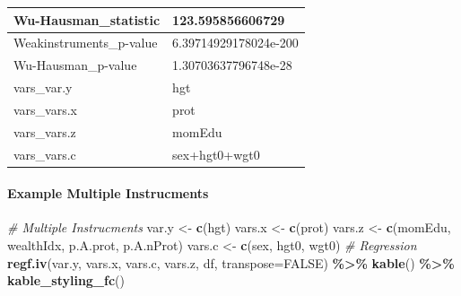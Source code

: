 \documentclass[
]{book}
\newenvironment{Shaded}{\begin{snugshade}}{\end{snugshade}}
\newcommand{\CommentTok}[1]{\textcolor[rgb]{0.56,0.35,0.01}{\textit{#1}}}
\newcommand{\DataTypeTok}[1]{\textcolor[rgb]{0.13,0.29,0.53}{#1}}
\newcommand{\KeywordTok}[1]{\textcolor[rgb]{0.13,0.29,0.53}{\textbf{#1}}}
\newcommand{\NormalTok}[1]{#1}
\newcommand{\OperatorTok}[1]{\textcolor[rgb]{0.81,0.36,0.00}{\textbf{#1}}}
\newcommand{\OtherTok}[1]{\textcolor[rgb]{0.56,0.35,0.01}{#1}}
\newcommand{\StringTok}[1]{\textcolor[rgb]{0.31,0.60,0.02}{#1}}
\begin{document}
\begin{table}[!h]
\begin{tabular}{l|l}
\hline
\rowcolor{gray!6}  Wu-Hausman\_statistic & 123.595856606729\\
\hline
Weakinstruments\_p-value & 6.39714929178024e-200\\
\hline
\rowcolor{gray!6}  Wu-Hausman\_p-value & 1.30703637796748e-28\\
\hline
vars\_var.y & hgt\\
\hline
\rowcolor{gray!6}  vars\_vars.x & prot\\
\hline
vars\_vars.z & momEdu\\
\hline
\rowcolor{gray!6}  vars\_vars.c & sex+hgt0+wgt0\\
\hline
\end{tabular}
\end{table}

\hypertarget{example-multiple-instrucments}{%
\paragraph{Example Multiple Instrucments}\label{example-multiple-instrucments}}

\begin{Shaded}
\begin{Highlighting}[]
\CommentTok{\# Multiple Instrucments}
\NormalTok{var.y \textless{}{-}}\StringTok{ }\KeywordTok{c}\NormalTok{(}\StringTok{\textquotesingle{}hgt\textquotesingle{}}\NormalTok{)}
\NormalTok{vars.x \textless{}{-}}\StringTok{ }\KeywordTok{c}\NormalTok{(}\StringTok{\textquotesingle{}prot\textquotesingle{}}\NormalTok{)}
\NormalTok{vars.z \textless{}{-}}\StringTok{ }\KeywordTok{c}\NormalTok{(}\StringTok{\textquotesingle{}momEdu\textquotesingle{}}\NormalTok{, }\StringTok{\textquotesingle{}wealthIdx\textquotesingle{}}\NormalTok{, }\StringTok{\textquotesingle{}p.A.prot\textquotesingle{}}\NormalTok{, }\StringTok{\textquotesingle{}p.A.nProt\textquotesingle{}}\NormalTok{)}
\NormalTok{vars.c \textless{}{-}}\StringTok{ }\KeywordTok{c}\NormalTok{(}\StringTok{\textquotesingle{}sex\textquotesingle{}}\NormalTok{, }\StringTok{\textquotesingle{}hgt0\textquotesingle{}}\NormalTok{, }\StringTok{\textquotesingle{}wgt0\textquotesingle{}}\NormalTok{)}
\CommentTok{\# Regression}
\KeywordTok{regf.iv}\NormalTok{(var.y, vars.x, vars.c, vars.z, df, }\DataTypeTok{transpose=}\OtherTok{FALSE}\NormalTok{) }\OperatorTok{\%\textgreater{}\%}
\StringTok{  }\KeywordTok{kable}\NormalTok{() }\OperatorTok{\%\textgreater{}\%}
\StringTok{  }\KeywordTok{kable\_styling\_fc}\NormalTok{()}
\end{Highlighting}
\end{Shaded}
\end{document}
